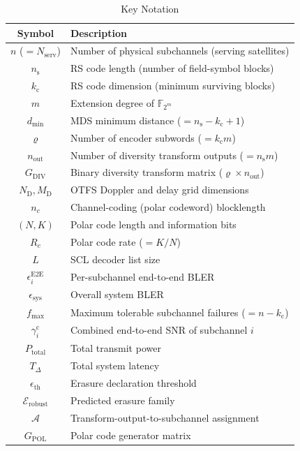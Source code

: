 \documentclass[journal]{IEEEtran}
\begin{document}
\begin{table}[t]
\centering

\caption{Key Notation}
\label{tab:notation}
\begin{tabular}{@{}cl@{}}
\toprule
\textbf{Symbol} & \textbf{Description} \\
\midrule
$n$ ($= N_{\text{serv}}$) & Number of physical subchannels (serving satellites) \\
$n_{\mathrm{s}}$ & RS code length (number of field-symbol blocks) \\
$k_{\mathrm{c}}$ & RS code dimension (minimum surviving blocks) \\
$m$ & Extension degree of $\mathbb{F}_{2^m}$ \\
$d_{\min}$ & MDS minimum distance ($= n_{\mathrm{s}} - k_{\mathrm{c}} + 1$) \\
$\varrho$ & Number of encoder subwords ($= k_{\mathrm{c}} m$) \\
$n_{\text{out}}$ & Number of diversity transform outputs ($= n_{\mathrm{s}} m$) \\
$G_{\mathrm{DIV}}$ & Binary diversity transform matrix ($\varrho \times n_{\text{out}}$) \\
$N_{\mathrm{D}}, M_{\mathrm{D}}$ & OTFS Doppler and delay grid dimensions \\
$n_c$ & Channel-coding (polar codeword) blocklength \\
$(N, K)$ & Polar code length and information bits \\
$R_c$ & Polar code rate ($= K/N$) \\
$L$ & SCL decoder list size \\
$\epsilon_i^{\mathrm{E2E}}$ & Per-subchannel end-to-end BLER \\
$\epsilon_{\mathrm{sys}}$ & Overall system BLER \\
$f_{\max}$ & Maximum tolerable subchannel failures ($= n - k_{\mathrm{c}}$) \\
$\gamma_i^{\mathrm{c}}$ & Combined end-to-end SNR of subchannel $i$ \\
$P_{\mathrm{total}}$ & Total transmit power \\
$T_{\Delta}$ & Total system latency \\
$\epsilon_{\mathrm{th}}$ & Erasure declaration threshold \\
$\mathcal{E}_{\mathrm{robust}}$ & Predicted erasure family \\
$\mathcal{A}$ & Transform-output-to-subchannel assignment \\
$G_{\mathrm{POL}}$ & Polar code generator matrix \\

\end{tabular}
\end{table}
\end{document}

